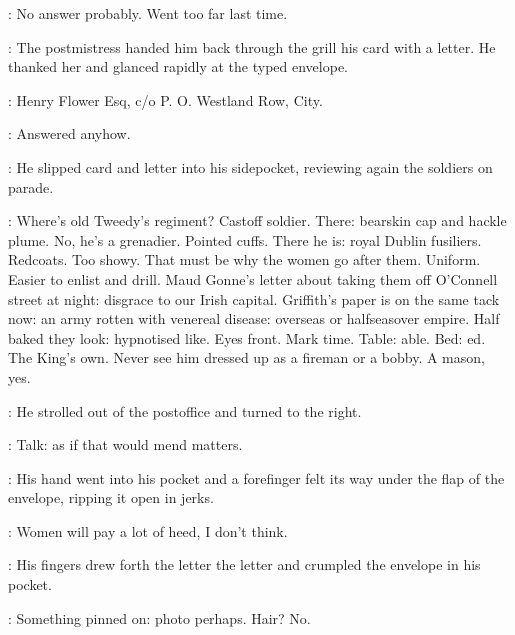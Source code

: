 \BloomInt:
No answer probably.
Went too far last time.

:
The postmistress handed him back through the grill
his card with a letter.
He thanked her and glanced rapidly at the typed envelope.

:
Henry Flower Esq,
c/o P. O. Westland Row,
City.

\BloomInt:
Answered anyhow.

:
He slipped card and letter into his sidepocket,
reviewing again the soldiers on parade.

\BloomInt:
Where's old Tweedy's regiment?
Castoff soldier.
There: bearskin cap and hackle plume.
No, he's a grenadier.
Pointed cuffs.
There he is: royal Dublin fusiliers.
Redcoats.
Too showy.
That must be why the women go after them.
Uniform.
Easier to enlist and drill.
Maud Gonne's letter about taking them off O'Connell street at night:
disgrace to our Irish capital.
Griffith's paper is on the same tack now:
an army rotten with venereal disease:
overseas or halfseasover empire.
Half baked they look:
hypnotised like.
Eyes front.
Mark time.
Table: able.
Bed: ed.
The King's own.
Never see him dressed up as a fireman or a bobby.
A mason, yes.

:
He strolled out of the postoffice and turned to the right.

\BloomInt:
Talk:
as if that would mend matters.

:
His hand went into his pocket
and a forefinger felt its way under the flap of the envelope,
ripping it open in jerks.

\BloomInt:
Women will pay a lot of heed, I don't think.

:
His fingers drew forth the letter
the letter and crumpled the envelope in his pocket.

\BloomInt:
Something pinned on:
photo perhaps.
Hair?
No.
